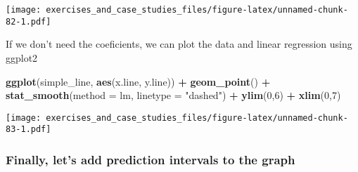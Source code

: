 \documentclass[]{book}
\newenvironment{Shaded}{\begin{snugshade}}{\end{snugshade}}
\newcommand{\DataTypeTok}[1]{\textcolor[rgb]{0.13,0.29,0.53}{#1}}
\newcommand{\DecValTok}[1]{\textcolor[rgb]{0.00,0.00,0.81}{#1}}
\newcommand{\KeywordTok}[1]{\textcolor[rgb]{0.13,0.29,0.53}{\textbf{#1}}}
\newcommand{\NormalTok}[1]{#1}
\newcommand{\OperatorTok}[1]{\textcolor[rgb]{0.81,0.36,0.00}{\textbf{#1}}}
\newcommand{\StringTok}[1]{\textcolor[rgb]{0.31,0.60,0.02}{#1}}
\theoremstyle{definition}
\theoremstyle{definition}
\theoremstyle{definition}
\theoremstyle{remark}
\begin{document}
\begin{Shaded}
\end{Shaded}

\texttt{[image: exercises\_and\_case\_studies\_files/figure-latex/unnamed-chunk-82-1.pdf]}

If we don't need the coeficients, we can plot the data and linear
regression using ggplot2

\begin{Shaded}
\begin{Highlighting}[]
\KeywordTok{ggplot}\NormalTok{(simple_line, }\KeywordTok{aes}\NormalTok{(x.line, y.line)) }\OperatorTok{+}
\StringTok{  }\KeywordTok{geom_point}\NormalTok{() }\OperatorTok{+}
\StringTok{  }\KeywordTok{stat_smooth}\NormalTok{(}\DataTypeTok{method =}\NormalTok{ lm, }\DataTypeTok{linetype =} \StringTok{"dashed"}\NormalTok{) }\OperatorTok{+}
\StringTok{  }\KeywordTok{ylim}\NormalTok{(}\DecValTok{0}\NormalTok{,}\DecValTok{6}\NormalTok{) }\OperatorTok{+}
\StringTok{  }\KeywordTok{xlim}\NormalTok{(}\DecValTok{0}\NormalTok{,}\DecValTok{7}\NormalTok{)}
\end{Highlighting}
\end{Shaded}

\texttt{[image: exercises\_and\_case\_studies\_files/figure-latex/unnamed-chunk-83-1.pdf]}

\hypertarget{finally-lets-add-prediction-intervals-to-the-graph}{%
\subsubsection{Finally, let's add prediction intervals to the
graph}\label{finally-lets-add-prediction-intervals-to-the-graph}}

\begin{Shaded}
\end{Shaded}
\end{document}

